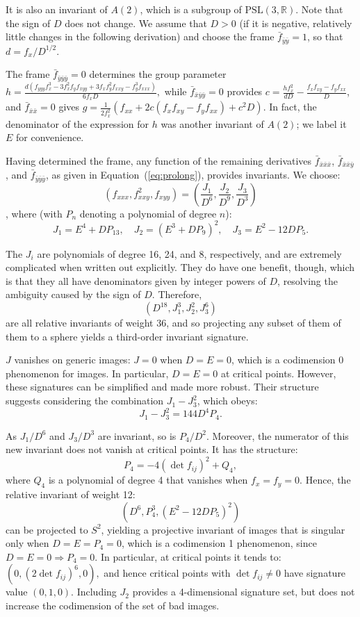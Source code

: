 \documentclass[review,onefignum,onetabnum]{siamonline190516}
\def\R{\mathbb{R}}
\begin{document}
{It is also an invariant of $A(2)$, which is a subgroup of $\mathrm{PSL}(3,\R)$. Note that the sign of $D$ does not change. We assume that $D>0$ (if it is negative, relatively little changes in the following derivation) and choose the frame $\bar f_{ \bar y \bar y} = 1$, so that $d = f_x/D^{1/2}.$

The frame $\bar f_{ \bar y \bar y \bar y} = 0$ determines the group parameter $ h = \frac{d(f_{yyy}f_x^3 - 3 f_x^2 f_y f_{xyy} + 3 f_x f_y^2 f_{xxy} - f_y^3 f_{xxx})}{6 f_x D},$ while $\bar f_{ \bar x \bar y \bar y}=0$ provides $ c = \frac{h f_x^2}{d D} - \frac{f_x f_{xy} - f_y f_{xx}}{D}$, and $\bar f_{ \bar x \bar x}=0$ gives $ g = \frac{1}{2 f_x^2}(f_{xx} + 2 c ( f_x f_{xy} - f_y f_{xx} ) + c^2 D).$ In fact, the denominator of the expression for $h$ was another invariant of $A(2)$; we label it $E$ for convenience.


Having determined the frame, any function of the remaining derivatives $\bar f_{ \bar x \bar x \bar x}$, $\bar f_{ \bar x \bar x \bar y}$, and $\bar f_{ \bar y \bar y \bar y}$, as given in Equation~(\ref{eq:prolong}), provides invariants. We choose: $$ (f_{xxx}, f_{xxy}^2, f_{xyy})=\left(\frac{J_1}{D^6},\frac{J_2}{D^9},\frac{J_3}{D^3}\right)$$, where (with $P_n$ denoting a polynomial of degree $n$):
$$ J_1 = E^4 + D P_{13},\quad J_2 = (E^3 + D P_9)^2,\quad J_3=E^2 -12 D P_5.$$

The $J_i$ are polynomials of degree 16, 24, and 8, respectively, and are extremely complicated when written out explicitly. They do have one benefit, though, which is that they  all have denominators given by integer powers of $D$, resolving the ambiguity caused by the sign of $D$. Therefore, $$ (D^{18}, J_1^3, J_2^2, J_3^6)$$ are all relative invariants of weight 36, and so projecting any subset of them of them to a sphere yields a third-order invariant signature.

$J$ vanishes on generic images: $J=0$ when $D=E=0$, which is a codimension 0 phenomenon for images. In particular, $D=E=0$ at critical points. However, these signatures can be simplified and made more robust. Their structure suggests considering the combination $J_1 - J_3^2$, which obeys:
$$J_1 - J_3^2 = 144 D^4 P_4.$$

As $J_1/D^6$ and $J_3/D^3$ are invariant, so is $P_4/D^2$. 
Moreover, the numerator of this new invariant does not vanish at critical points.  It has the structure:
$$P_4 = -4(\det f_{ij})^2 + Q_4,$$
where $Q_4$ is a polynomial of degree 4 that vanishes when $f_x=f_y=0$. Hence, the relative invariant of weight 12:
$$ (D^6, P_4^3, (E^2-12D P_5)^2)$$
can be projected to $S^2$, yielding a projective invariant of images that is singular only when $D=E=P_4=0$, which is a codimension 1 phenomenon, since  $D=E=0\Rightarrow P_4=0$. In particular, at critical points it tends to:
$(0, (2\det f_{ij})^6, 0),$ and hence critical points with $\det f_{ij}\ne 0$ have signature value $(0,1,0)$.
Including $J_2$ provides a 4-dimensional signature set, but does not increase the codimension of the set of bad images.

}
\end{document}
